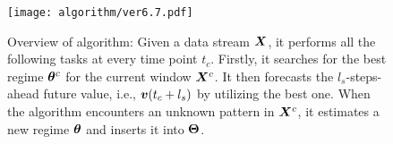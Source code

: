 \begin{figure}[t]
    \begin{center}
        \texttt{[image: algorithm/ver6.7.pdf]}
        \vspace{-4.0ex}
        \caption{Overview of \method algorithm: Given a data stream $\bm{X}$, it performs all the following tasks at every time point $t_c$. Firstly, it searches for the best regime $\boldsymbol{\theta}^c$ for the current window $\bm{X}^c$. It then forecasts the $l_s$-steps-ahead future value, i.e., $\bm{v}(t_c+l_s)$ by utilizing the best one. When the algorithm encounters an unknown pattern in $\bm{X}^c$, it estimates a new regime $\boldsymbol{\theta}$ and inserts it into $\boldsymbol{\Theta}$.}
        \label{fig:algorithm}
    \end{center}
    \vspace{-0.5ex}
\end{figure}